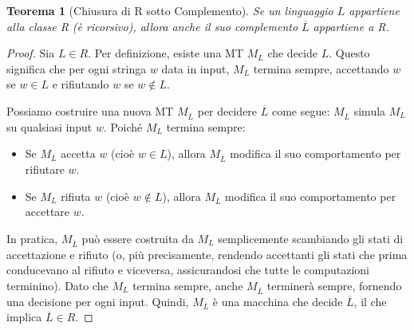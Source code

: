 \documentclass[a4paper]{article}
\newtheorem{theorem}{Teorema}
\begin{document}
\begin{theorem}[Chiusura di R sotto Complemento]
Se un linguaggio $L$ appartiene alla classe R (è ricorsivo), allora anche il suo complemento $\overline{L}$ appartiene a R.
\end{theorem}
\begin{proof}
Sia $L \in R$. Per definizione, esiste una MT $M_L$ che decide $L$. Questo significa che per ogni stringa $w$ data in input, $M_L$ termina sempre, accettando $w$ se $w \in L$ e rifiutando $w$ se $w \notin L$.

Possiamo costruire una nuova MT $M_{\overline{L}}$ per decidere $\overline{L}$ come segue:
$M_{\overline{L}}$ simula $M_L$ su qualsiasi input $w$. Poiché $M_L$ termina sempre:
\begin{itemize}
    \item Se $M_L$ accetta $w$ (cioè $w \in L$), allora $M_{\overline{L}}$ modifica il suo comportamento per rifiutare $w$.
    \item Se $M_L$ rifiuta $w$ (cioè $w \notin L$), allora $M_{\overline{L}}$ modifica il suo comportamento per accettare $w$.
\end{itemize}
In pratica, $M_{\overline{L}}$ può essere costruita da $M_L$ semplicemente scambiando gli stati di accettazione e rifiuto (o, più precisamente, rendendo accettanti gli stati che prima conducevano al rifiuto e viceversa, assicurandosi che tutte le computazioni terminino).
Dato che $M_L$ termina sempre, anche $M_{\overline{L}}$ terminerà sempre, fornendo una decisione per ogni input. Quindi, $M_{\overline{L}}$ è una macchina che decide $\overline{L}$, il che implica $\overline{L} \in R$.
\end{proof}
\end{document}
